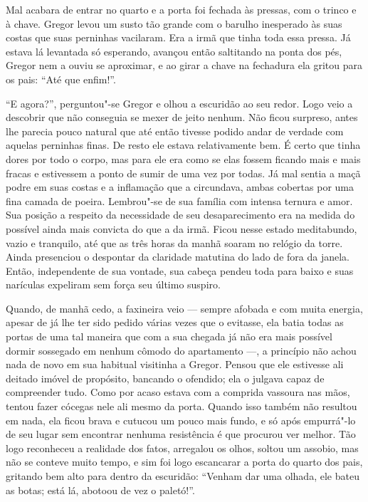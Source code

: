 Mal acabara de entrar no quarto e a porta foi fechada às pressas, com o
trinco e à chave. Gregor levou um susto tão grande com o barulho
inesperado às suas costas que suas perninhas vacilaram. Era a irmã que
tinha toda essa pressa. Já estava lá levantada só esperando, avançou então
saltitando na ponta dos pés, Gregor nem a ouviu se aproximar, e ao girar a
chave na fechadura ela gritou para os pais: “Até que enfim!”.

“E agora?”, perguntou"-se Gregor e olhou a escuridão ao seu redor. Logo
veio a descobrir que não conseguia se mexer de jeito nenhum. Não ficou
surpreso, antes lhe parecia pouco natural que até então tivesse podido
andar de verdade com aquelas perninhas finas. De resto ele estava
relativamente bem. É certo que tinha dores por todo o corpo, mas para ele
era como se elas fossem ficando mais e mais fracas e estivessem a ponto de
sumir de uma vez por todas. Já mal sentia a maçã podre em suas costas e a
inflamação que a circundava, ambas cobertas por uma fina camada de poeira.
Lembrou"-se de sua família com intensa ternura e amor. Sua posição a
respeito da necessidade de seu desaparecimento era na medida do possível
ainda mais convicta do que a da irmã. Ficou nesse estado meditabundo,
vazio e tranquilo, até que as três horas da manhã soaram no relógio da
torre. Ainda presenciou o despontar da claridade matutina do lado de fora
da janela. Então, independente de sua vontade, sua cabeça pendeu toda para
baixo e suas narículas expeliram sem força seu último suspiro.

Quando, de manhã cedo, a faxineira veio --- sempre afobada e com muita
energia, apesar de já lhe ter sido pedido várias vezes que o evitasse, ela
batia todas as portas de uma tal maneira que com a sua chegada já não era
mais possível dormir sossegado em nenhum cômodo do apartamento ---, a
princípio não achou nada de novo em sua habitual visitinha a Gregor.
Pensou que ele estivesse ali deitado imóvel de propósito, bancando o
ofendido; ela o julgava capaz de compreender tudo. Como por acaso estava
com a comprida vassoura nas mãos, tentou fazer cócegas nele ali mesmo da
porta. Quando isso também não resultou em nada, ela ficou brava e cutucou
um pouco mais fundo, e só após empurrá"-lo de seu lugar sem encontrar
nenhuma resistência é que procurou ver melhor. Tão logo reconheceu a
realidade dos fatos, arregalou os olhos, soltou um assobio, mas não se
conteve muito tempo, e sim foi logo escancarar a porta do quarto dos pais,
gritando bem alto para dentro da escuridão: “Venham dar uma olhada, ele
bateu as botas; está lá, abotoou de vez o paletó!”.

